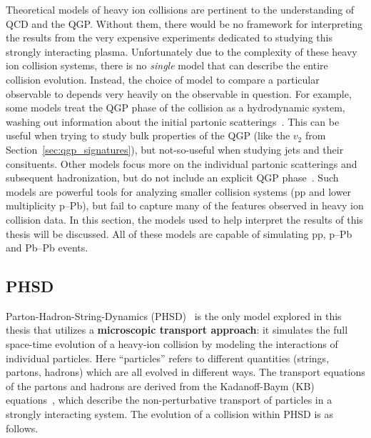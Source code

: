 Theoretical models of heavy ion collisions are pertinent to the understanding of QCD and the QGP. Without them, there would be no framework for interpreting the results from the very expensive experiments dedicated to studying this strongly interacting plasma. Unfortunately due to the complexity of these heavy ion collision systems, there is no \textit{single} model that can describe the entire collision evolution. Instead, the choice of model to compare a particular observable to depends very heavily on the observable in question. For example, some models treat the QGP phase of the collision as a hydrodynamic system, washing out information about the initial partonic scatterings~\cite{EPOS}. This can be useful when trying to study bulk properties of the QGP (like the $v_2$ from Section~\ref{sec:qgp_signatures}), but not-so-useful when studying jets and their consituents. Other models focus more on the individual partonic scatterings and subsequent hadronization, but do not include an explicit QGP phase~\cite{Pythia, DPMJet}. Such models are powerful tools for analyzing smaller collision systems (pp and lower multiplicity p--Pb), but fail to capture many of the features observed in heavy ion collision data. In this section, the models used to help interpret the results of this thesis will be discussed. All of these models are capable of simulating pp, p--Pb and Pb--Pb events.

\subsection{PHSD}
Parton-Hadron-String-Dynamics (PHSD)~\cite{PHSD1, PHSD2} is the only model explored in this thesis that utilizes a \textbf{microscopic transport approach}: it simulates the full space-time evolution of a heavy-ion collision by modeling the interactions of individual particles. Here ``particles'' refers to different quantities (strings, partons, hadrons) which are all evolved in different ways. The transport equations of the partons and hadrons are derived from the Kadanoff-Baym (KB) equations~\cite{KBEq}, which describe the non-perturbative transport of particles in a strongly interacting system. The evolution of a collision within PHSD is as follows.

